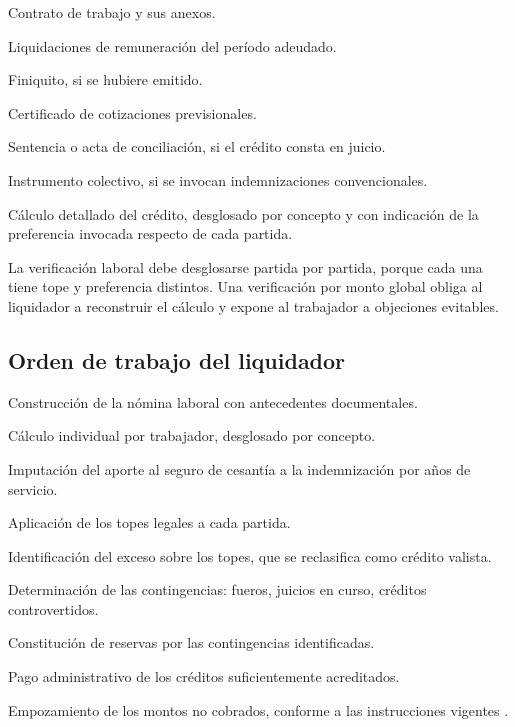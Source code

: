 \begin{checklist}
  \item Contrato de trabajo y sus anexos.
  \item Liquidaciones de remuneración del período adeudado.
  \item Finiquito, si se hubiere emitido.
  \item Certificado de cotizaciones previsionales.
  \item Sentencia o acta de conciliación, si el crédito consta en juicio.
  \item Instrumento colectivo, si se invocan indemnizaciones convencionales.
  \item Cálculo detallado del crédito, desglosado por concepto y con indicación de la
  preferencia invocada respecto de cada partida.
\end{checklist}

\begin{practica}
La verificación laboral debe desglosarse partida por partida, porque cada una tiene tope
y preferencia distintos. Una verificación por monto global obliga al liquidador a
reconstruir el cálculo y expone al trabajador a objeciones evitables.
\end{practica}

\subsection{Orden de trabajo del liquidador}

\begin{checklist}
  \item Construcción de la nómina laboral con antecedentes documentales.
  \item Cálculo individual por trabajador, desglosado por concepto.
  \item Imputación del aporte al seguro de cesantía a la indemnización por años de
  servicio.
  \item Aplicación de los topes legales a cada partida.
  \item Identificación del exceso sobre los topes, que se reclasifica como crédito
  valista.
  \item Determinación de las contingencias: fueros, juicios en curso, créditos
  controvertidos.
  \item Constitución de reservas por las contingencias identificadas.
  \item Pago administrativo de los créditos suficientemente acreditados.
  \item Empozamiento de los montos no cobrados, conforme a las instrucciones vigentes
  \parencite{oficio-5003}.
\end{checklist}

